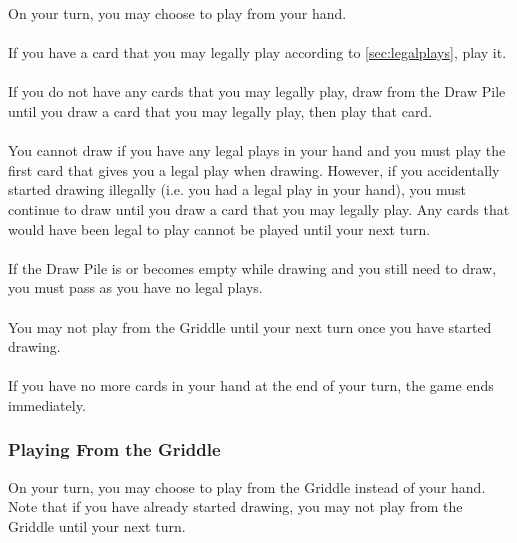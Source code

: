 \documentclass{article}
\begin{document}
On your turn, you may choose to play from your hand.

\paragraph{}
If you have a card that you may legally play according to \autoref{sec:legalplays}, play it.

\paragraph{}
If you do not have any cards that you may legally play, draw from the Draw Pile until you draw a card that you may legally play, then play that card.

\paragraph{}
You cannot draw if you have any legal plays in your hand and you must play the first card that gives you a legal play when drawing.
However, if you accidentally started drawing illegally (i.e. you had a legal play in your hand), you must continue to draw until you draw a card that you may legally play. Any cards that would have been legal to play cannot be played until your next turn.

\paragraph{}
If the Draw Pile is or becomes empty while drawing and you still need to draw, you must pass as you have no legal plays.

\paragraph{}
You may not play from the Griddle until your next turn once you have started drawing.

\paragraph{}
If you have no more cards in your hand at the end of your turn, the game ends immediately.

\subsubsection{Playing From the Griddle}
\label{sec:fromstack}

On your turn, you may choose to play from the Griddle instead of your hand. Note that if you have already started drawing, you may not play from the Griddle until your next turn.
\end{document}
